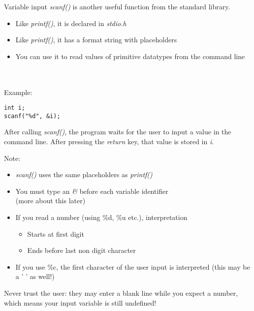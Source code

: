 \begin{frame}[fragile]{Variable input}
	\textit{scanf()} is another useful function from the standard library.
	\begin{itemize}
		\item Like \textit{printf()}, it is declared in \textit{stdio.h}
		\item Like \textit{printf()}, it has a format string with placeholders
		\item You can use it to read values of primitive datatypes from the command line
	\end{itemize}
	\ \\ \ \\ Example:
	\begin{lstlisting}[numbers=none]
int i;
scanf("%d", &i);
\end{lstlisting}
	After calling \textit{scanf()}, the program waits for the user to input a value in the command line.
	After pressing the \textit{return} key, that value is stored in \textit{i}.
\end{frame}

\begin{frame}{Note:}
	\begin{itemize}
		\item \textit{scanf()} uses the same placeholders as \textit{printf()}
		\item You must type an \textit{\&} before each variable identifier \\
			(more about this later)
		\item If you read a number (using \%d, \%u etc.), interpretation
		\begin{itemize}
			\item Starts at first digit
			\item Ends before last non digit character
		\end{itemize}
		\item If you use \%c, the first character of the user input is interpreted (this may be a ' ' as well!)
	\end{itemize}
	Never trust the user: they may enter a blank line while you expect a number, which means your input variable is still undefined!
\end{frame}
